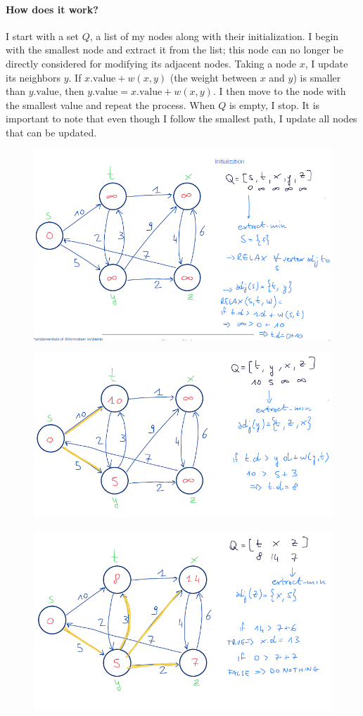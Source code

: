 \paragraph{How does it work?} I start with a set $Q$, a list of my nodes along with their initialization. I begin with the smallest node and extract it from the list; this node can no longer be directly considered for modifying its adjacent nodes. Taking a node $x$, I update its neighbors $y$. If $x.\text{value} + w(x, y)$ (the weight between $x$ and $y$) is smaller than $y.\text{value}$, then $y.\text{value} = x.\text{value} + w(x, y)$. I then move to the node with the smallest value and repeat the process. When $Q$ is empty, I stop. It is important to note that even though I follow the smallest path, I update all nodes that can be updated.
\newpage
\begin{figure}[H]
    \centering
    \includegraphics[width=0.75\linewidth]{dij ex 1.png}

\end{figure}

\begin{figure}[H]
    \centering
    \includegraphics[width=0.75\linewidth]{dij ex 2.png}

\end{figure}

\begin{figure}[H]
    \centering
    \includegraphics[width=0.75\linewidth]{dij ex 3.png}

\end{figure}

